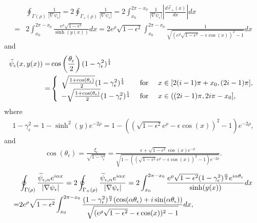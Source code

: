 \documentclass[1 [leqno, 11pt]{amsart}
\numberwithin{equation}{section}
\let\ep=\epsilon
\def\gep{\gamma_\epsilon}
\begin{document}
\begin{CJK*}{GBK}{song}
\begin{align}
&\oint_{\Gamma (\rho)} \frac{1}{|\nabla \psi_\ep|}=2\oint_{\Gamma_+ (\rho)} \frac{1}{|\nabla \psi_\ep|}=2\int_{x_0}^{2\pi-x_0}\frac{1}{|\nabla \psi_\ep|}\left|\frac{d \vec{r}_{+}(x)}{dx}\right|dx\\\label{Gamma-rho-nabla-psi1}
=&2\int_{x_0}^{2\pi-x_0}\frac{e^\rho \sqrt{1-\ep^2}}{ \sinh(y(x))}dx
=2e^\rho \sqrt{1-\ep^2}\int_{x_0}^{2\pi-x_0}\frac{1}{ \sqrt{(e^\rho \sqrt{1-\ep^2}-\ep \cos(x))^2-1} }dx
\end{align}
and
\begin{align}\label{psi-p-x}
\tilde{\psi}_\ep(x,y(x)) =& \cos\left(\frac{\theta_\ep}{2}\right)(1-\gep^2)^{1\over4} \\\nonumber
=& \left\{ \begin{array}{lll} \sqrt{\frac{1+\cos(\theta_\ep)}{2}} (1-\gep^2)^{1\over4} &\mbox{ for } & x \in [2(i-1)\pi + x_0, (2i - 1)\pi ],\\
 -\sqrt{\frac{1+\cos(\theta_\ep)}{2}} (1-\gep^2)^{1\over4} &\mbox{ for } & x \in ((2i - 1)\pi, 2i\pi - x_0],
 \end{array} \right.
\end{align}
where
\begin{align}\label{psi-p-x1}
1 - \gep^2 = 1 - \sinh^2(y)e^{-2\rho} = 1 - \left(\left( \sqrt{1-\ep^2} e^{\rho} - \ep \cos(x) \right)^2 - 1\right) e^{-2\rho},
\end{align}
and
\begin{align}\label{psi-p-x2}
\cos(\theta_\ep) = \frac{\xi_\ep}{\sqrt{1-\gep^2}} = \frac{\ep + \sqrt{1-\ep^2} \cos(x) e^{-\rho} }{\sqrt{1 - \left(\left( \sqrt{1-\ep^2} e^{\rho} - \ep \cos(x) \right)^2 - 1\right) e^{-2\rho}}}.
\end{align}
\fi
\begin{align}\nonumber
&\oint_{\Gamma (\rho)} \frac{\widetilde\psi_{\ep,\alpha} e^{i \alpha x}}{|\nabla \psi_\ep|}=2\oint_{\Gamma_+ (\rho)} \frac{\widetilde\psi_{\ep,\alpha} e^{i \alpha x}}{|\nabla \psi_\ep|}=2\int_{x_0}^{2\pi-x_0}\frac{e^\rho \sqrt{1-\ep^2}(1-\gamma_\ep^2)^{\alpha\over2}e^{i\alpha\theta_\ep}}{ \sinh(y(x))}dx\\\label{Gamma-rho-nabla-tilde-psi2}
=&2e^\rho \sqrt{1-\ep^2}\int_{x_0}^{2\pi-x_0}\frac{(1-\gamma_\ep^2)^{\alpha\over2}(\cos(\alpha\theta_\ep)+i\sin(\alpha\theta_\ep))}{ \sqrt{(e^\rho \sqrt{1-\ep^2}-\ep \cos(x))^2-1} }dx,

\end{align}
\end{CJK*}
\end{document}
